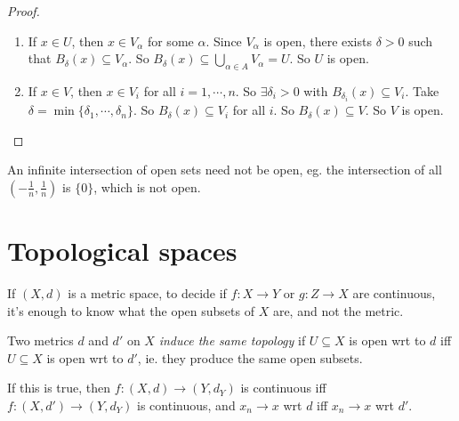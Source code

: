 \documentclass[a4paper]{article}
\begin{document}
\begin{proof}\leavevmode
  \begin{enumerate}
    \item If $x\in U$, then $x\in V_\alpha$ for some $\alpha$. Since $V_\alpha$ is open, there exists $\delta > 0$ such that $B_\delta(x) \subseteq V_\alpha$. So $\displaystyle B_\delta (x) \subseteq \bigcup_{\alpha \in A}V_\alpha = U$. So $U$ is open.
    \item If $x\in V$, then $x\in V_i$ for all $i = 1, \cdots, n$. So $\exists \delta_i > 0$ with $B_{\delta_i}(x) \subseteq V_i$. Take $\delta = \min\{\delta_1, \cdots, \delta_n\}$. So $B_\delta(x) \subseteq V_i$ for all $i$. So $B_\delta(x) \subseteq V$. So $V$ is open.
  \end{enumerate}
\end{proof}
\note An infinite intersection of open sets need not be open, eg. the intersection of all $(-\frac{1}{n}, \frac{1}{n})$ is $\{0\}$, which is not open.

\section{Topological spaces}
If $(X, d)$ is a metric space, to decide if $f: X\to Y$ or $g: Z\to X$ are continuous, it's enough to know what the open subsets of $X$ are, and not the metric.

\begin{defi}
  Two metrics $d$ and $d'$ on $X$ \emph{induce the same topology} if $U\subseteq X$ is open wrt to $d$ iff $U\subseteq X$ is open wrt to $d'$, ie. they produce the same open subsets.

\end{defi}
If this is true, then $f: (X, d) \to (Y, d_Y)$  is continuous iff $f: (X, d') \to (Y, d_Y)$ is continuous, and $x_n \to x$ wrt $d$ iff $x_n \to x$ wrt $d'$.
\end{document}
